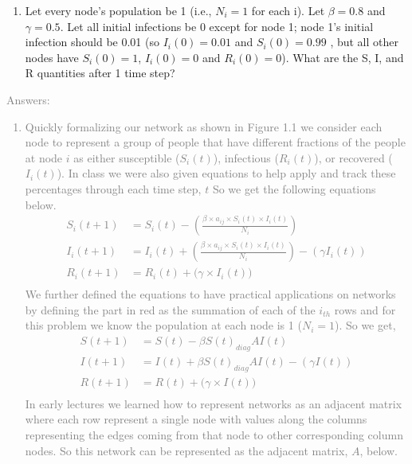 \documentclass[11pt]{article}
\begin{document}
\begin{enumerate}
	\item Let every node's population be 1 (i.e., $N_i = 1$  for each i). Let  $\beta = 0.8$ and $\gamma = 0.5$. Let all initial infections be 0 except for node 1; node 1's initial infection should be 0.01 (so  $I_i(0)=0.01$ and $S_i(0)=0.99$ , but all other nodes have $S_i(0)=1$,  $I_i(0) = 0$ and $R_i(0) = 0$). What are the S, I, and R quantities after 1 time step?
\end{enumerate}
\textcolor{gray}{
Answers:
\begin{enumerate}
		\item Quickly formalizing our network as shown in Figure 1.1 we consider each node to represent a group of people that have different fractions of the people at node $i$ as either susceptible ($S_i(t)$), infectious ($R_i(t)$), or recovered ($I_i(t)$). In class we were also given equations to help apply and track these percentages through each time step, $t$ So we get the following equations below.
\begin{align*}
	S_i(t+1) 	&=  S_i(t) - \left(\frac{\beta \times a_{ij} \times S_i(t) \times I_i(t)}{N_i}\right) \\
	I_i(t+1) 	&=  I_i(t) + \left(\frac{\beta \times a_{ij} \times S_i(t) \times I_i(t)}{N_i}\right) - (\gamma I_i(t)) \\
	R_i(t+1) 	&=  R_i(t) + \big(\gamma \times I_i(t)\big) \\
\end{align*}
We further defined the equations to have practical applications on networks by defining the part in red as the summation of each of the $i_{th}$ rows and for this problem we know the population at each node is 1 ($N_i=1$). So we get,
\begin{align*}
	S(t+1) 	&=  S(t) - \beta S(t)_{diag} AI(t) \\
	I(t+1) 	&=  I(t) + \beta S(t)_{diag}AI(t) - (\gamma I(t)) \\
	R(t+1) 	&=  R(t) + \big(\gamma \times I(t)\big) \\
\end{align*}
In early lectures we learned how to represent networks as an adjacent matrix where each row represent a single node with values along the columns representing the edges coming from that node to other corresponding column nodes.  So this network can be represented as the adjacent matrix, $A$, below.\\
\begin{center}

\end{center}
\end{enumerate}}
\end{document}

